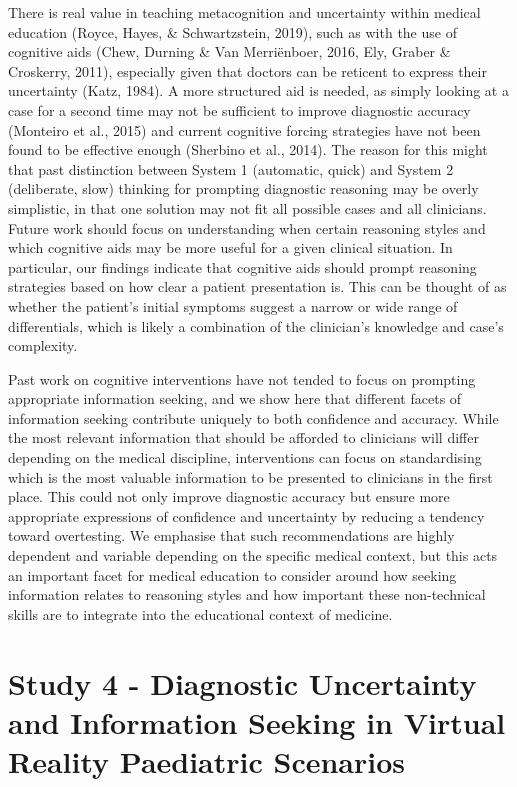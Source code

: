 \documentclass[a4paper, nobind]{templates/ociamthesis}
\begin{document}
There is real value in teaching metacognition and uncertainty within medical education (Royce, Hayes, \& Schwartzstein, 2019), such as with the use of cognitive aids (Chew, Durning \& Van Merriënboer, 2016, Ely, Graber \& Croskerry, 2011), especially given that doctors can be reticent to express their uncertainty (Katz, 1984). A more structured aid is needed, as simply looking at a case for a second time may not be sufficient to improve diagnostic accuracy (Monteiro et al., 2015) and current cognitive forcing strategies have not been found to be effective enough (Sherbino et al., 2014). The reason for this might that past distinction between System 1 (automatic, quick) and System 2 (deliberate, slow) thinking for prompting diagnostic reasoning may be overly simplistic, in that one solution may not fit all possible cases and all clinicians. Future work should focus on understanding when certain reasoning styles and which cognitive aids may be more useful for a given clinical situation. In particular, our findings indicate that cognitive aids should prompt reasoning strategies based on how clear a patient presentation is. This can be thought of as whether the patient's initial symptoms suggest a narrow or wide range of differentials, which is likely a combination of the clinician's knowledge and case's complexity.

Past work on cognitive interventions have not tended to focus on prompting appropriate information seeking, and we show here that different facets of information seeking contribute uniquely to both confidence and accuracy. While the most relevant information that should be afforded to clinicians will differ depending on the medical discipline, interventions can focus on standardising which is the most valuable information to be presented to clinicians in the first place. This could not only improve diagnostic accuracy but ensure more appropriate expressions of confidence and uncertainty by reducing a tendency toward overtesting. We emphasise that such recommendations are highly dependent and variable depending on the specific medical context, but this acts an important facet for medical education to consider around how seeking information relates to reasoning styles and how important these non-technical skills are to integrate into the educational context of medicine.

\hypertarget{study-4---diagnostic-uncertainty-and-information-seeking-in-virtual-reality-paediatric-scenarios}{%
\chapter*{Study 4 - Diagnostic Uncertainty and Information Seeking in Virtual Reality Paediatric Scenarios}\label{study-4---diagnostic-uncertainty-and-information-seeking-in-virtual-reality-paediatric-scenarios}}
\end{document}
